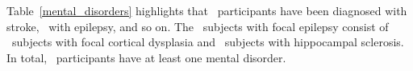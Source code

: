 

\noindent
Table~\ref{mental_disorders} highlights that \SubjectsWithStrokeCount\ participants have been 
diagnosed with stroke, \SubjectsWithEpilepsyCount\ with epilepsy, and so on. 
The \SubjectsWithFocalEpilepsyCount\ subjects with focal epilepsy consist of \SubjectsWithFCDCount\ subjects 
with focal cortical dysplasia and \SubjectsWithHSCount\ subjects with hippocampal sclerosis.
In total, \TotalSubjectsWithDisordersCount\ participants have at least one mental disorder.




